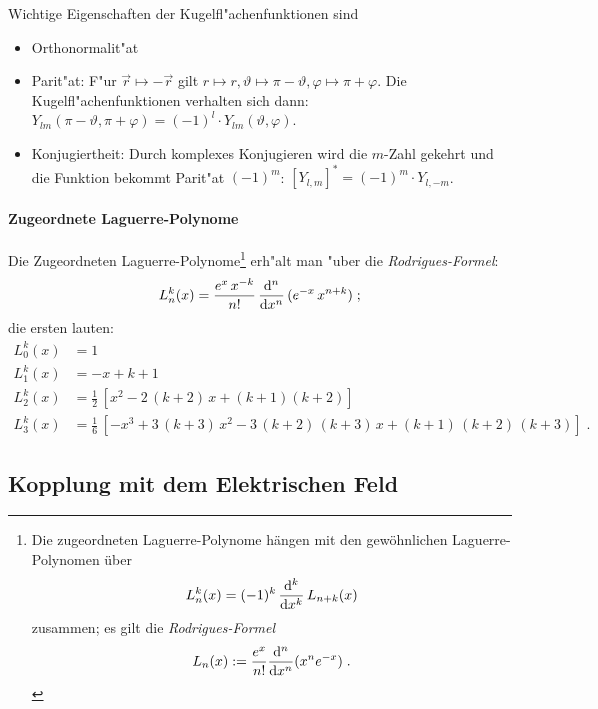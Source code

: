 \documentclass[a4paper,draft]{article}
\begin{document}
Wichtige Eigenschaften der Kugelfl"achenfunktionen sind
\begin{itemize}
\item Orthonormalit"at
\item Parit"at: F"ur $\vec r \mapsto - \vec r$ gilt $r \mapsto r,
  \vartheta \mapsto \pi - \vartheta, \varphi \mapsto \pi +
  \varphi$. Die Kugelfl"achenfunktionen verhalten sich dann:
  $Y_{lm}(\pi-\vartheta,\pi+\varphi) = (-1)^l \cdot Y_{lm}(\vartheta,\varphi)$.
\item Konjugiertheit: Durch komplexes Konjugieren wird die $m$-Zahl
  gekehrt und die Funktion bekommt Parit"at $(-1)^m$: 
$\left[ Y_{l,m} \right ]^\ast = (-1)^m \cdot Y_{l,-m}$.
\end{itemize}


\paragraph{Zugeordnete Laguerre-Polynome}
\label{sec:zugeordnete_laguerre_polynome}

Die Zugeordneten Laguerre-Polynome\footnote{Die zugeordneten
  Laguerre-Polynome hängen mit den gewöhnlichen Laguerre-Polynomen
  über$$L_n^k(x) = (-1)^k \, \frac{{\rm d}^k}{{\rm d}x^k} \,
  L_{n+k}(x)$$ zusammen; es gilt die
  \emph{Rodrigues-Formel} $$L_n(x):=\frac{e^x}{n!} \frac{{\rm
      d}^n}{{\rm d}x^n}(x^n e^{-x}) \;.$$} erh"alt man "uber die
\emph{Rodrigues-Formel}:
\begin{equation*}
  L_n^k(x) = \frac{e^x \, x^{-k}}{n!} \, \frac{{\rm d}^n}{{\rm d}x^n}
  \, (e^{-x}\,x^{n+k}) \;;
\end{equation*}
die ersten lauten:
\begin{align*}
L_0^k(x) &= 1\\
L_1^k(x) &= -x + k + 1\\
L_2^k(x) &= \frac{1}{2}\,\left[x^2 - 2\,(k+2)\,x + (k+1)(k+2)\right]\\
L_3^k(x) &= \frac{1}{6}\,\left[-x^3 +3\,(k+3)\,x^2 -
  3\,(k+2)\,(k+3)\,x + (k+1)\,(k+2)\,(k+3)\right] \;.
\end{align*}











\subsection{Kopplung mit dem Elektrischen Feld}
\label{sec:kopplung_mit_dem_elektrischen_feld}
\end{document}
